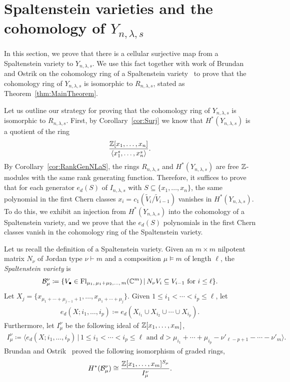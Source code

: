 \documentclass[12pt]{amsart}
\newcommand{\st}{\,|\,}
\newcommand{\Fl}{\mathrm{Fl}}
\newcommand{\la}{\lambda}
\begin{document}
\section{Spaltenstein varieties and the cohomology of $Y_{n,\lambda,s}$}\label{sec:SpaltensteinAndCohomology}


In this section, we prove that there is a cellular surjective map from a Spaltenstein variety to $Y_{n,\la,s}$. We use this fact together with work of Brundan and Ostrik on the cohomology ring of a Spaltenstein variety~\cite{Brundan-Ostrik} to prove that the cohomology ring of $Y_{n,\la,s}$ is isomorphic to $R_{n,\la,s}$, stated as Theorem~\ref{thm:MainTheorem}.

Let us outline our strategy for proving that the cohomology ring of $Y_{n,\la,s}$ is isomorphic to $R_{n,\la,s}$. First, by Corollary~\ref{cor:Surj} we know that $H^*(Y_{n,\la,s})$ is a quotient of the ring
\begin{align}
\frac{\mathbb{Z}[x_1,\dots,x_n]}{\langle x_1^s,\dots, x_n^s\rangle}.
\end{align}
By Corollary~\ref{cor:RankGenNLaS}, the rings $R_{n,\la,s}$ and $H^*(Y_{n,\la,s})$ are free $\mathbb{Z}$-modules with the same rank generating function. Therefore, it suffices to prove that for each generator $e_d(S)$ of $I_{n,\la,s}$ with $S\subseteq \{x_1,\dots, x_n\}$, the same polynomial in the first Chern classes $x_i = c_1(\widetilde V_i/\widetilde V_{i-1})$ vanishes in $H^*(Y_{n,\la,s})$. To do this, we exhibit an injection from $H^*(Y_{n,\la,s})$ into the cohomology of a Spaltenstein variety, and we prove that the $e_d(S)$ polynomials in the first Chern classes vanish in the cohomology ring of the Spaltenstein variety.

Let us recall the definition of a Spaltenstein variety. Given an $m\times m$ nilpotent matrix $N_\nu$ of Jordan type $\nu\vdash m$ and a composition $\mu\vDash m$ of length $\ell$, the \emph{Spaltenstein variety} is
\begin{align}
\cB_\mu^{\nu} \coloneqq \{V_\bullet \in \Fl_{\mu_1,\,\mu_1+\mu_2,\dots,\, m}(\bC^m)\st N_\nu V_i \subseteq V_{i-1} \text{ for }i\leq \ell\}.
\end{align}
Let $X_j = \{x_{\mu_1+\cdots + \mu_{j-1}+1},\dots, x_{\mu_1+\cdots +\mu_j}\}$. Given $1\leq i_1<\cdots < i_p\leq \ell$, let 
\begin{align}
e_d(X;i_1,\dots, i_p) \coloneqq e_d(X_{i_1}\cup X_{i_2}\cup\cdots \cup X_{i_p}).
\end{align}
Furthermore, let $I_\mu^\nu$ be the following ideal of $\mathbb{Z}[x_1,\dots, x_m]$,
\begin{align}
I_\mu^\nu \coloneqq \langle e_d(X;i_1,\dots, i_p) \st 1\leq i_1 < \cdots < i_p\leq \ell\text{ and }  d > \mu_{i_1} + \cdots + \mu_{i_p} - \nu'_{\ell-p+1} -\cdots - \nu'_m \rangle.
\end{align}
Brundan and Ostrik~\cite{Brundan-Ostrik} proved the following isomorphism of graded rings,
\begin{align}
H^*(\mathcal{B}_\mu^\nu) \cong \frac{\mathbb{Z}[x_1,\dots, x_m]^{S_{\mu}}}{I_{\mu}^\nu}.
\end{align}
\end{document}

